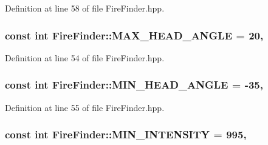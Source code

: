 Definition at line 58 of file Fire\-Finder.\-hpp.

\hypertarget{classFireFinder_ace5a0c6c6435a4d36377dc94a5f785db}{
\subsubsection[{M\-A\-X\-\_\-\-H\-E\-A\-D\-\_\-\-A\-N\-G\-L\-E}]{\setlength{\rightskip}{0pt plus 5cm}const int Fire\-Finder\-::\-M\-A\-X\-\_\-\-H\-E\-A\-D\-\_\-\-A\-N\-G\-L\-E = 20\hspace{0.3cm}{\ttfamily [static]}, {\ttfamily [private]}}}\label{classFireFinder_ace5a0c6c6435a4d36377dc94a5f785db}


Definition at line 54 of file Fire\-Finder.\-hpp.

\hypertarget{classFireFinder_ac6743699fd08f97088855dc1e87f8dea}{
\subsubsection[{M\-I\-N\-\_\-\-H\-E\-A\-D\-\_\-\-A\-N\-G\-L\-E}]{\setlength{\rightskip}{0pt plus 5cm}const int Fire\-Finder\-::\-M\-I\-N\-\_\-\-H\-E\-A\-D\-\_\-\-A\-N\-G\-L\-E = -\/35\hspace{0.3cm}{\ttfamily [static]}, {\ttfamily [private]}}}\label{classFireFinder_ac6743699fd08f97088855dc1e87f8dea}


Definition at line 55 of file Fire\-Finder.\-hpp.

\hypertarget{classFireFinder_aa05ce7d7760ac59ea294df68475dcf05}{
\subsubsection[{M\-I\-N\-\_\-\-I\-N\-T\-E\-N\-S\-I\-T\-Y}]{\setlength{\rightskip}{0pt plus 5cm}const int Fire\-Finder\-::\-M\-I\-N\-\_\-\-I\-N\-T\-E\-N\-S\-I\-T\-Y = 995\hspace{0.3cm}{\ttfamily [static]}, {\ttfamily [private]}}}\label{classFireFinder_aa05ce7d7760ac59ea294df68475dcf05}


